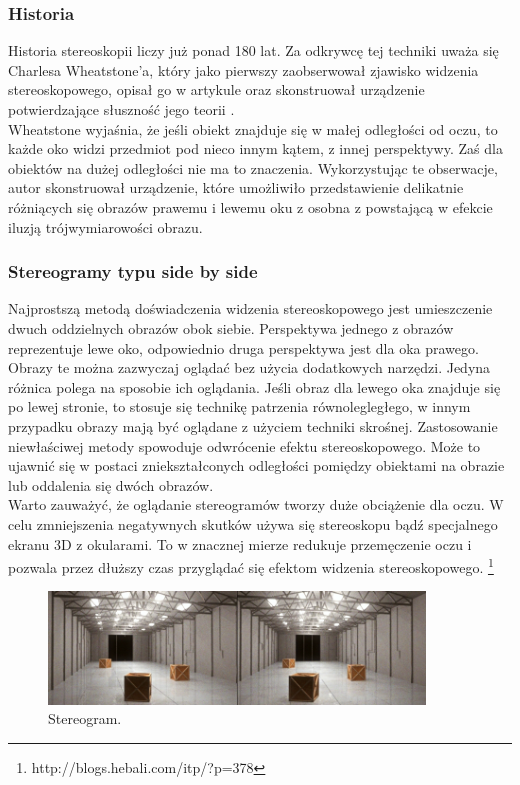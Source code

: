 \subsubsection{Historia} 
Historia stereoskopii liczy już ponad 180 lat. Za odkrywcę tej techniki uważa się Charlesa Wheatstone'a, który jako pierwszy zaobserwował zjawisko widzenia stereoskopowego, opisał go w artykule \cite{wheatstone} oraz skonstruował urządzenie potwierdzające słuszność jego teorii \cite{stereoscopehistory}.\\
Wheatstone wyjaśnia, że jeśli obiekt znajduje się w małej odległości od oczu, to każde oko widzi przedmiot pod nieco innym kątem, z innej perspektywy. Zaś dla obiektów na dużej odległości nie ma to znaczenia. Wykorzystując te obserwacje, autor skonstruował urządzenie, które umożliwiło przedstawienie delikatnie różniących się obrazów prawemu i lewemu oku z osobna z powstającą w efekcie iluzją trójwymiarowości obrazu.

\subsubsection{Stereogramy typu side by side}
Najprostszą metodą doświadczenia widzenia stereoskopowego jest umieszczenie dwuch oddzielnych obrazów obok siebie. Perspektywa jednego z obrazów reprezentuje lewe oko, odpowiednio druga perspektywa jest dla oka prawego. Obrazy te można zazwyczaj oglądać bez użycia dodatkowych narzędzi. Jedyna różnica polega na sposobie ich oglądania. Jeśli obraz dla lewego oka znajduje się po lewej stronie, to stosuje się technikę patrzenia równolegległego, w innym przypadku obrazy mają być oglądane z użyciem techniki skrośnej. Zastosowanie niewłaściwej metody spowoduje odwrócenie efektu stereoskopowego. Może to ujawnić się w postaci zniekształconych odległości pomiędzy obiektami na obrazie lub oddalenia się dwóch obrazów. \\
Warto zauważyć, że oglądanie stereogramów tworzy duże obciążenie dla oczu. W celu zmniejszenia negatywnych skutków używa się stereoskopu bądź specjalnego ekranu 3D z okularami. To w znacznej mierze redukuje przemęczenie oczu i pozwala przez dłuższy czas przyglądać się efektom widzenia stereoskopowego.
\footnote{http://blogs.hebali.com/itp/?p=378}
\begin{figure}[H]
		\centering
 		\includegraphics[width=10cm]{sbs.jpg}
    	\caption{Stereogram.}
 		\label{rys1}
\end{figure}


